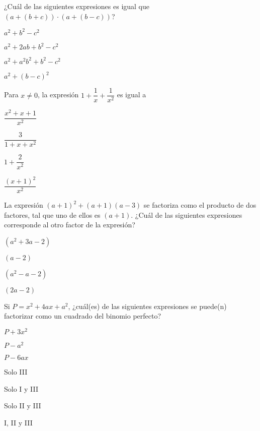 \documentclass{sn-guia}
\begin{document}
\begin{preguntas}
    \pregunta ¿Cuál de las siguientes expresiones es igual que $\left( a + (b+c) \right)\cdot\left( a + (b-c) \right)$?
    \begin{alternativas}
        \item $a^2 + b^2 - c^2$
        \item $a^2 + 2ab + b^2 - c^2$
        \item $a^2 + a^2b^2 + b^2 - c^2$
        \item $a^2 + (b-c)^2$
    \end{alternativas}    

    \pregunta Para $x \neq 0$, la expresión $1 + \dfrac{1}{x} + \dfrac{1}{x^2}$ es igual a
    \begin{alternativas}[]
        \item $\dfrac{x^2+x+1}{x^2}$
        \item $\dfrac{3}{1+x+x^2}$
        \item $1+\dfrac{2}{x^2}$
        \item $\dfrac{(x+1)^2}{x^2}$
    \end{alternativas}

    \pregunta La expresión $(a+1)^2 + (a+1)(a-3)$ se factoriza como el producto de dos factores, tal 
    que uno de ellos es $(a+1)$.
    ¿Cuál de las siguientes expresiones corresponde al otro factor de la expresión?
    \begin{alternativas}
        \item $\left(a^2 + 3a -2\right)$
        \item $\left(a-2\right)$
        \item $\left(a^2 -a -2\right)$
        \item $\left(2a -2\right)$
    \end{alternativas}

    \pregunta Si $P = x^2 + 4ax + a^2$, ¿cuál(es) de las siguientes expresiones se puede(n) factorizar
    como un cuadrado del binomio perfecto?
    \begin{tcenter}
        \begin{alternativas*}[label=(\Roman*)]
            \item $P + 3x^2$
            \item $P - a^2$
            \item $P -6ax$
        \end{alternativas*}             
    \end{tcenter}
    \begin{alternativas}[]
        \item Solo III
        \item Solo I y III
        \item Solo II y III
        \item I, II y III
    \end{alternativas}


\end{preguntas}
\end{document}
